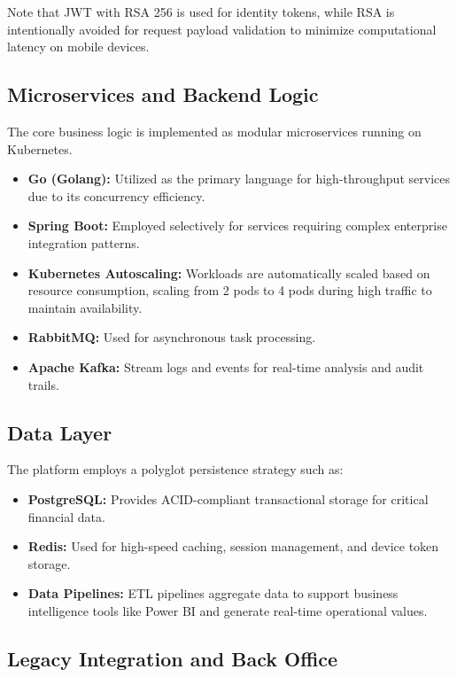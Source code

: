 \documentclass[12pt,oneside,openright,a4paper]{cpe-english-project}
\begin{document}
Note that JWT with RSA 256 is used for identity tokens, while RSA is
intentionally avoided for request payload validation to minimize
computational latency on mobile devices.

\subsection{Microservices and Backend Logic}

The core business logic is implemented as modular microservices running
on Kubernetes.

\begin{itemize}
\item
  \textbf{Go (Golang):} Utilized as the primary language for
  high-throughput services due to its concurrency efficiency.
\item
  \textbf{Spring Boot:} Employed selectively for services requiring
  complex enterprise integration patterns.
\item
  \textbf{Kubernetes Autoscaling:} Workloads are automatically scaled
  based on resource consumption, scaling from 2 pods to 4 pods during
  high traffic to maintain availability.
\item
  \textbf{RabbitMQ:} Used for asynchronous task processing.
\item
  \textbf{Apache Kafka:} Stream logs and events for real-time analysis
  and audit trails.
\end{itemize}

\subsection{Data Layer}

The platform employs a polyglot persistence strategy such as:

\begin{itemize}
\item
  \textbf{PostgreSQL:} Provides ACID-compliant transactional storage for
  critical financial data.
\item
  \textbf{Redis:} Used for high-speed caching, session management, and
  device token storage.
\item
  \textbf{Data Pipelines:} ETL pipelines aggregate data to support
  business intelligence tools like Power BI and generate real-time
  operational values.
\end{itemize}

\subsection{Legacy Integration and Back Office}
\end{document}
